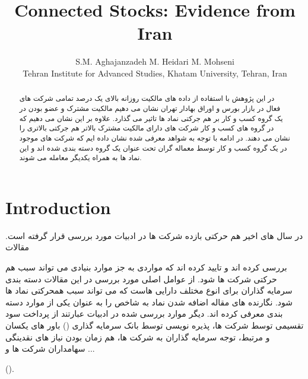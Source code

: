 \documentclass[12pt, a4paper]{article}
\title{Connected Stocks: Evidence from Iran}
\author{S.M. Aghajanzadeh\sym{*} \qquad M. Heidari\sym{*} \qquad M. Mohseni\sym{*} \\
\sym{*} \footnotesize  Tehran Institute for Advanced Studies, Khatam University, Tehran, Iran
}
\begin{document}
\maketitle


\begin{abstract}
در این پژوهش با استفاده از داده های مالکیت روزانه بالای یک درصد تمامی شرکت های فعال در بازار بورس و اوراق بهادار تهران نشان می دهیم مالکیت مشترک و عضو بودن در یک گروه کسب و کار بر هم جرکتی نماد ها تاثیر می گذارد. علاوه بر این نشان می دهیم که در گروه های کسب و کار شرکت های دارای مالکیت مشترک بالاتر هم جرکتی بالاتری را نشان می دهند. در ادامه با توجه به شواهد معرفی شده نشان داده ایم که شرکت های موجود در یک گروه کسب و کار توسط معماله گران تحت عنوان یک  گروه دسته بندی شده اند و این نماد ها به همراه یکدیگر معامله می شوند.
\end{abstract}





\section{Introduction}

در سال های اخیر هم حرکتی بازده شرکت ها در ادبیات مورد بررسی قرار گرفته است. مقالات
 

بررسی کرده اند و تایید کرده اند که مواردی به جز موارد بنیادی می تواند سبب هم حرکتی شرکت ها شود. از عوامل اصلی مورد بررسی در این مقالات دسته بندی سرمایه گذاران برای انوع مختلف دارایی هاست که می تواند سبب همحرکتی نماد ها شود. نگارنده های مقاله اضافه شدن نماد به شاخص 
را به عنوان یکی از موارد دسته بندی معرفی کرده اند. دیگر موارد بررسی شده در ادبیات عبارتند از پرداخت سود تقسیمی توسط شرکت ها، پذیره نویسی توسط بانک سرمایه گذاری 
()
باور های یکسان و مرتبط، توجه سرمایه گذاران به شرکت ها، هم زمان بودن نیاز های نقدینگی سهامداران شرکت ها و ... 

().
\end{document}
